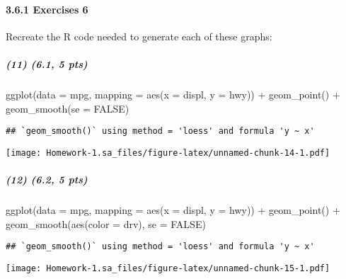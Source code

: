 \documentclass[
]{article}
\newenvironment{Shaded}{\begin{snugshade}}{\end{snugshade}}
\newcommand{\AttributeTok}[1]{\textcolor[rgb]{0.77,0.63,0.00}{#1}}
\newcommand{\ConstantTok}[1]{\textcolor[rgb]{0.00,0.00,0.00}{#1}}
\newcommand{\FunctionTok}[1]{\textcolor[rgb]{0.00,0.00,0.00}{#1}}
\newcommand{\NormalTok}[1]{#1}
\newcommand{\SpecialCharTok}[1]{\textcolor[rgb]{0.00,0.00,0.00}{#1}}
\begin{document}
\hypertarget{exercises-6}{%
\paragraph{3.6.1 Exercises 6}\label{exercises-6}}

Recreate the R code needed to generate each of these graphs:

\hypertarget{pts}{%
\subparagraph{(11) (6.1, 5 pts)}\label{pts}}

\begin{Shaded}
\begin{Highlighting}[]
\FunctionTok{ggplot}\NormalTok{(}\AttributeTok{data =}\NormalTok{ mpg, }\AttributeTok{mapping =} \FunctionTok{aes}\NormalTok{(}\AttributeTok{x =}\NormalTok{ displ, }\AttributeTok{y =}\NormalTok{ hwy)) }\SpecialCharTok{+} 
  \FunctionTok{geom\_point}\NormalTok{() }\SpecialCharTok{+} 
  \FunctionTok{geom\_smooth}\NormalTok{(}\AttributeTok{se =} \ConstantTok{FALSE}\NormalTok{)}
\end{Highlighting}
\end{Shaded}

\begin{verbatim}
## `geom_smooth()` using method = 'loess' and formula 'y ~ x'
\end{verbatim}

\texttt{[image: Homework-1.sa\_files/figure-latex/unnamed-chunk-14-1.pdf]}

\hypertarget{pts-1}{%
\subparagraph{(12) (6.2, 5 pts)}\label{pts-1}}

\begin{Shaded}
\begin{Highlighting}[]
\FunctionTok{ggplot}\NormalTok{(}\AttributeTok{data =}\NormalTok{ mpg, }\AttributeTok{mapping =} \FunctionTok{aes}\NormalTok{(}\AttributeTok{x =}\NormalTok{ displ, }\AttributeTok{y =}\NormalTok{ hwy)) }\SpecialCharTok{+} 
  \FunctionTok{geom\_point}\NormalTok{() }\SpecialCharTok{+} 
  \FunctionTok{geom\_smooth}\NormalTok{(}\FunctionTok{aes}\NormalTok{(}\AttributeTok{color =}\NormalTok{ drv), }\AttributeTok{se =} \ConstantTok{FALSE}\NormalTok{) }
\end{Highlighting}
\end{Shaded}

\begin{verbatim}
## `geom_smooth()` using method = 'loess' and formula 'y ~ x'
\end{verbatim}

\texttt{[image: Homework-1.sa\_files/figure-latex/unnamed-chunk-15-1.pdf]}
\end{document}
